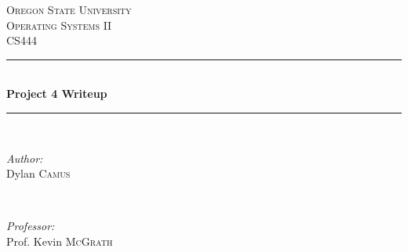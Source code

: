 \documentclass[journal,letterpaper,draftclsnofoot,onecolumn,10pt]{IEEEtran}
\begin{document}
\begin{titlepage}

\newcommand{\HRule}{\rule{\linewidth}{0.5mm}} %

\center %
 

\textsc{\LARGE Oregon State University}\\[1.5cm] %
\textsc{\Large Operating Systems II}\\[0.5cm] %
\textsc{\large CS444}\\[0.5cm] %


\HRule \\[0.4cm]
{ \huge \bfseries Project 4 Writeup}\\[0.4cm] %
\HRule \\[1.5cm]
 

\begin{minipage}{0.4\textwidth}
   \begin{flushleft} \large
      \emph{Author:}\\
      Dylan \textsc{Camus} %
   \end{flushleft}
\end{minipage}
~
\begin{minipage}{0.4\textwidth}
   \begin{flushright} \large
      \emph{Professor:} \\
      Prof. Kevin \textsc{McGrath} %
   \end{flushright}
\end{minipage}\\[4cm]



\end{titlepage}
\end{document}
